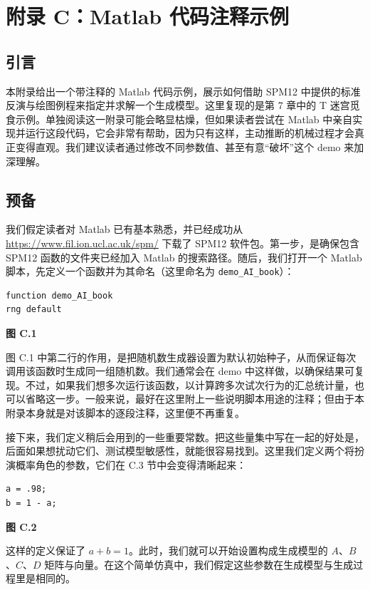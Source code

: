 \chapter{附录 C：Matlab 代码注释示例}

\section{引言}

本附录给出一个带注释的 Matlab 代码示例，展示如何借助 SPM12 中提供的标准反演与绘图例程来指定并求解一个生成模型。这里复现的是第 7 章中的 T 迷宫觅食示例。单独阅读这一附录可能会略显枯燥，但如果读者尝试在 Matlab 中亲自实现并运行这段代码，它会非常有帮助，因为只有这样，主动推断的机械过程才会真正变得直观。我们建议读者通过修改不同参数值、甚至有意“破坏”这个 demo 来加深理解。

\section{预备}

我们假定读者对 Matlab 已有基本熟悉，并已经成功从 \url{https://www.fil.ion.ucl.ac.uk/spm/} 下载了 SPM12 软件包。第一步，是确保包含 SPM12 函数的文件夹已经加入 Matlab 的搜索路径。随后，我们打开一个 Matlab 脚本，先定义一个函数并为其命名（这里命名为 \verb|demo_AI_book|）：

\begin{verbatim}
function demo_AI_book
rng default
\end{verbatim}

\noindent\textbf{图 C.1}

图 C.1 中第二行的作用，是把随机数生成器设置为默认初始种子，从而保证每次调用该函数时生成同一组随机数。我们通常会在 demo 中这样做，以确保结果可复现。不过，如果我们想多次运行该函数，以计算跨多次试次行为的汇总统计量，也可以省略这一步。一般来说，最好在这里附上一些说明脚本用途的注释；但由于本附录本身就是对该脚本的逐段注释，这里便不再重复。

接下来，我们定义稍后会用到的一些重要常数。把这些量集中写在一起的好处是，后面如果想扰动它们、测试模型敏感性，就能很容易找到。这里我们定义两个将扮演概率角色的参数，它们在 C.3 节中会变得清晰起来：

\begin{verbatim}
a = .98;
b = 1 - a;
\end{verbatim}

\noindent\textbf{图 C.2}

这样的定义保证了 $a+b=1$。此时，我们就可以开始设置构成生成模型的 $A$、$B$、$C$、$D$ 矩阵与向量。在这个简单仿真中，我们假定这些参数在生成模型与生成过程里是相同的。

